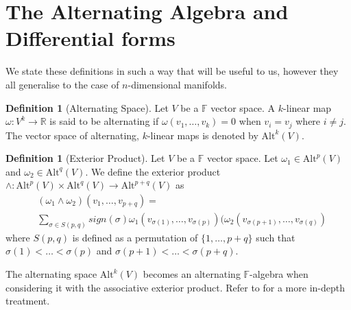 \documentclass[11pt]{report}
\theoremstyle{definition}
\newtheorem{defn}[thm]{Definition}
\begin{document}
\section{The Alternating Algebra and Differential forms}
We state these definitions in such a way that will be useful to us, however they all generalise to the case of $n$-dimensional manifolds.
\begin{defn}[Alternating Space]\label{AltSpc}
  Let $V$ be a $\mathbb{F}$ vector space. A $k$-linear map $\omega:V^k\rightarrow \mathbb{R}$ is said to be alternating if $\omega(v_1,\ldots,v_k)=0$ when $v_i=v_j$ where $i\neq j$. The vector space of alternating, $k$-linear maps is denoted by $\text{Alt}^k(V)$.
\end{defn}
\begin{defn}[Exterior Product]
  Let $V$ be a $\mathbb{F}$ vector space. Let $\omega_1 \in \text{Alt}^p(V)$ and $\omega_2 \in \text{Alt}^q(V)$. We define the exterior product $\wedge : \text{Alt}^p(V) \times \text{Alt}^q(V) \rightarrow \text{Alt}^{p+q}(V)$ as 
  \begin{align*}
    &(\omega_1 \wedge \omega_2)(v_1,\ldots,v_{p+q})= \\
    &\sum_{\sigma \in S(p,q)}sign(\sigma)\omega_1(v_{\sigma(1)},\ldots,v_{\sigma(p)})(\omega_2(v_{\sigma(p+1)},\ldots,v_{\sigma(q)})
  \end{align*}
  where $S(p,q)$ is defined as a permutation of $\{1,\ldots,p+q\}$ such that $\sigma(1) < \ldots < \sigma(p)$ and $\sigma(p+1) < \ldots < \sigma(p+q)$.
\end{defn}
The alternating space $\text{Alt}^k(V)$ becomes an alternating $\mathbb{F}$-algebra when considering it with the associative exterior product. Refer to \cite[p.11]{calcohomo} for a more in-depth treatment.
\end{document}
